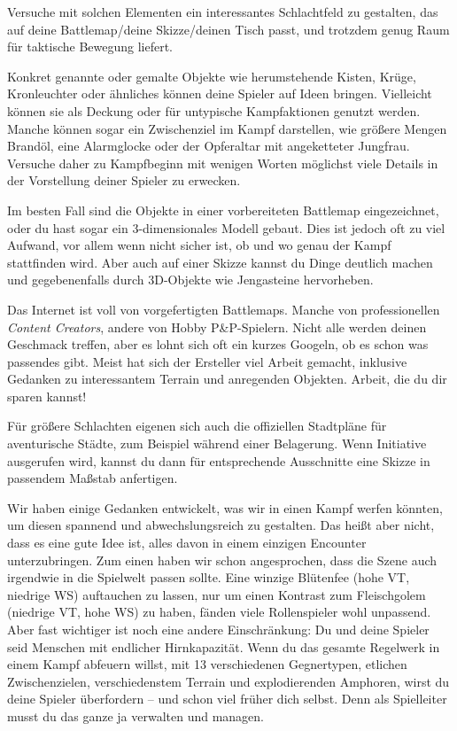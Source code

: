  Versuche mit solchen Elementen ein interessantes Schlachtfeld zu gestalten, das auf deine Battlemap/deine Skizze/deinen Tisch passt, und trotzdem genug Raum für taktische Bewegung liefert. 

Konkret genannte oder gemalte Objekte wie herumstehende Kisten, Krüge, Kronleuchter oder ähnliches können deine Spieler auf Ideen bringen.
 Vielleicht können sie als Deckung oder für untypische Kampfaktionen genutzt werden.
 Manche können sogar ein Zwischenziel im Kampf darstellen, wie größere Mengen Brandöl, eine Alarmglocke oder der Opferaltar mit angeketteter Jungfrau.
 Versuche daher zu Kampfbeginn mit wenigen Worten möglichst viele Details in der Vorstellung deiner Spieler zu erwecken.
 
 Im besten Fall sind die Objekte in einer vorbereiteten Battlemap eingezeichnet, oder du hast sogar ein 3-dimensionales Modell gebaut. Dies ist jedoch oft zu viel Aufwand, vor allem wenn nicht sicher ist, ob und wo genau der Kampf stattfinden wird. Aber auch auf einer Skizze kannst du Dinge deutlich machen und gegebenenfalls durch 3D-Objekte wie Jengasteine hervorheben.

Das Internet ist voll von vorgefertigten Battlemaps. Manche von professionellen \textit{Content Creators}, andere von Hobby P\&P-Spielern. Nicht alle werden deinen Geschmack treffen, aber es lohnt sich oft ein kurzes Googeln, ob es schon was passendes gibt.
Meist hat sich der Ersteller viel Arbeit gemacht, inklusive Gedanken zu interessantem Terrain und anregenden Objekten.
Arbeit, die du dir sparen kannst!

Für größere Schlachten eigenen sich auch die offiziellen Stadtpläne für aventurische Städte, zum Beispiel während einer Belagerung.
Wenn Initiative ausgerufen wird, kannst du dann für entsprechende Ausschnitte eine Skizze in passendem Maßstab anfertigen.

\platz


\platz

Wir haben einige Gedanken entwickelt, was wir in einen Kampf werfen könnten, um diesen spannend und abwechslungsreich zu gestalten.
Das heißt aber nicht, dass es eine gute Idee ist, alles davon in einem einzigen Encounter unterzubringen.
Zum einen haben wir schon angesprochen, dass die Szene auch irgendwie in die Spielwelt passen sollte.
Eine winzige Blütenfee (hohe VT, niedrige WS) auftauchen zu lassen, nur um einen Kontrast zum Fleischgolem (niedrige VT, hohe WS) zu haben, fänden viele Rollenspieler wohl unpassend.
Aber fast wichtiger ist noch eine andere Einschränkung:
Du und deine Spieler seid Menschen mit endlicher Hirnkapazität. Wenn du das gesamte Regelwerk in einem Kampf abfeuern willst, mit 13 verschiedenen Gegnertypen, etlichen Zwischenzielen, verschiedenstem Terrain und explodierenden Amphoren, wirst du deine Spieler überfordern -- und schon viel früher dich selbst.
Denn als Spielleiter musst du das ganze ja verwalten und managen. 


